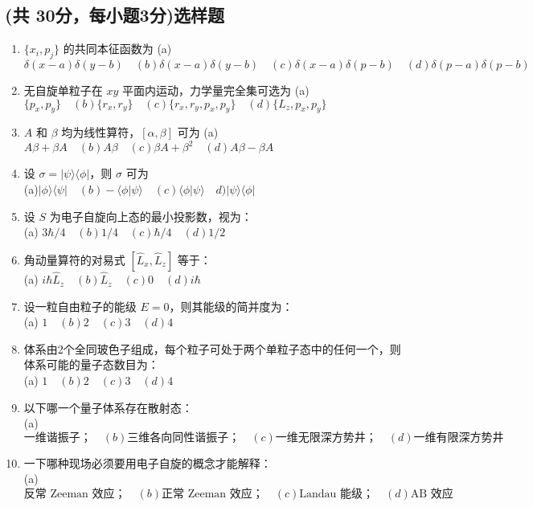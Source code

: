\subsection{(共 30分，每小题3分)选样题}
\begin{enumerate}
    \item $\{x_i, p_j\}$ 的共同本征函数为 
(a) $\delta(x-a)\delta(y-b)\quad  (b) \delta(x-a)\delta(y-b) \quad (c) \delta(x-a)\delta(p-b) \quad (d) \delta(p-a)\delta(p-b)$
    \item 无自旋单粒子在 $xy$ 平面内运动，力学量完全集可选为 
(a) $\{p_x, p_y\} \quad (b) \{r_x, r_y\}\quad (c) \{r_x, r_y, p_x, p_y\}\quad (d) \{L_z, p_x, p_y\}$
    \item $A$ 和 $\beta$ 均为线性算符，$[\alpha, \beta]$ 可为 
(a) $A\beta + \beta A\quad (b) A\beta\quad (c) \beta A + \beta^2\quad (d) A\beta - \beta A$
    \item 设 $\sigma = |\psi\rangle \langle\phi|$，则 $\sigma$ 可为\\ 
(a)$|\phi\rangle \langle\psi| \quad (b) -\langle\phi|\psi\rangle \quad (c) \langle\phi|\psi\rangle\quad d) |\psi\rangle \langle\phi|$
     \item 设 $S$ 为电子自旋向上态的最小投影数，视为：\\
(a) $3\hbar/4 \quad (b) 1/4 \quad  (c) \hbar/4 \quad (d) 1/2 $
     \item 角动量算符的对易式 $[\hat{L}_x, \hat{L}_z]$ 等于：\\
(a) $i\hbar\hat{L}_z \quad (b) \hat{L}_z  \quad  (c) 0 \quad (d) i\hbar $
\item 设一粒自由粒子的能级 $ E = 0$，则其能级的简并度为：\\
(a) $1 \quad (b) 2  \quad  (c) 3 \quad (d) 4 $
\item 体系由2个全同玻色子组成，每个粒子可处于两个单粒子态中的任何一个，则体系可能的量子态数目为：\\
(a) $1 \quad (b) 2  \quad  (c) 3 \quad (d) 4 $
\item 以下哪一个量子体系存在散射态：\\
(a) $ \text{一维谐振子；} \quad (b) \text{三维各向同性谐振子；}  \quad  (c) \text{一维无限深方势井；} \quad (d)\text{一维有限深方势井} $
\item 一下哪种现场必须要用电子自旋的概念才能解释：\\
(a) $ \text{反常 Zeeman 效应；} \quad (b) \text{正常 Zeeman 效应；}  \quad  (c) \text{Landau 能级；} \quad (d)\text{AB 效应} $
\end{enumerate}
